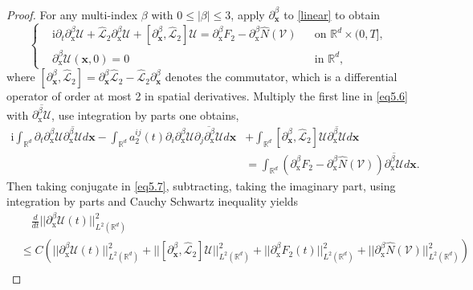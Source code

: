 \documentclass[11pt,reqno,oneside]{amsart}
\numberwithin{equation}{section}
\theoremstyle{definition}
\theoremstyle{remark}
\numberwithin{equation}{section}
\begin{document}
\begin{proof}
			For any multi-index $\beta$ with $0\le|\beta|\le 3$, apply $\partial_{\mathbf{x}}^\beta$
		to \eqref{linear} to obtain
		\begin{equation}\label{eq5.6}
			\left\{
			\begin{aligned}
				&\mathrm{i}\partial_t \partial^{\beta}_{\mathrm{x}}\mathscr{U}+\hat{\mathcal{L}}_2 \partial^{\beta}_{\mathrm{x}}\mathscr{U}+[\partial_\mathbf{x}^\beta,\hat{\mathcal{L}}_2]\mathscr{U}= \partial^{\beta}_{\mathrm{x}}F_2 -  \partial^{\beta}_{\mathrm{x}}\hat{N}(\mathscr{V}) &&\text{on } \mathbb{R}^d \times (0,T], \\
				&\partial^{\beta}_{\mathrm{x}}\mathscr{U}(\mathbf{x},0) = 0&& \text{in } \mathbb{R}^d,
			\end{aligned}
			\right.
		\end{equation}
		where $[\partial_\mathbf{x}^\beta,\hat{\mathcal{L}}_2] =\partial_\mathbf{x}^\beta \hat{\mathcal{L}}_2- \hat{\mathcal{L}}_2\partial_\mathbf{x}^\beta $ denotes the commutator, 
		which is a differential operator of order at most 2 in spatial derivatives.  Multiply the first line in \eqref{eq5.6} with $\overline{\partial^{\beta}_{\mathrm{x}}\mathscr{U}}$, use integration by parts one obtains,
		\begin{equation}\label{eq5.7}
			\begin{aligned}
					\mathrm{i}\int_{\mathbb{R}^d}\partial_{t}\partial^{\beta}_{\mathrm{x}}\mathscr{U} \overline{\partial^{\beta}_{\mathrm{x}}\mathscr{U}}d\mathbf{x}-\int_{\mathbb{R}^d}a^{ij}_{2}(t)\partial_{i}\partial^{\beta}_{\mathrm{x}}\mathscr{U}\overline{\partial_{j}\partial^{\beta}_{\mathrm{x}}\mathscr{U}}d\mathbf{x}&+\int_{\mathbb{R}^d}[\partial_\mathbf{x}^\beta,\hat{\mathcal{L}}_2]\mathscr{U}\overline{\partial^{\beta}_{\mathrm{x}}\mathscr{U}}d\mathbf{x}\\
				&=\int_{\mathbb{R}^d}(\partial^{\beta}_{\mathrm{x}}F_2 -  \partial^{\beta}_{\mathrm{x}}\hat{N}(\mathscr{V}))\overline{\partial^{\beta}_{\mathrm{x}}\mathscr{U}}d\mathbf{x} .
			\end{aligned}
		\end{equation}
		Then taking conjugate in \eqref{eq5.7}, subtracting, taking the imaginary part, using integration by parts and Cauchy Schwartz inequality yields 
		\begin{equation}\label{eq5.10}
			\begin{aligned}
					&\quad \frac{d}{dt}||\partial^{\beta}_{\mathrm{x}}\mathscr{U}(t)||^2_{L^{2}(\mathbb{R}^d)}
				\\
		 &\leqslant C\left(|| \partial^{\beta}_{\mathrm{x}}\mathscr{U}(t)||^{2}_{L^{2}(\mathbb{R}^d)}+|| [\partial_\mathbf{x}^\beta,\hat{\mathcal{L}}_2]\mathscr{U}||^{2}_{L^{2}(\mathbb{R}^d)}+||\partial^{\beta}_{\mathrm{x}} F_2(t)||^{2}_{L^{2}(\mathbb{R}^d)}+||\partial^{\beta}_{\mathrm{x}}\hat{N}(\mathscr{V})||^{2}_{L^{2}(\mathbb{R}^d)}\right)\\

\end{aligned}
\end{equation}
\end{proof}
\end{document}
